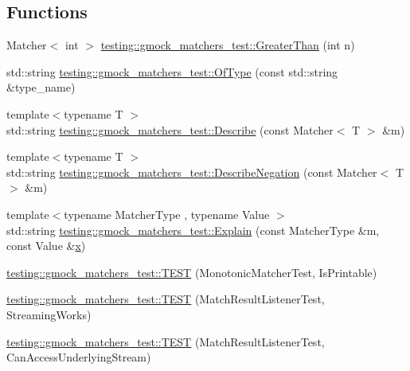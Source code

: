 \subsection*{Functions}
\begin{DoxyCompactItemize}
\item 
Matcher$<$ int $>$ \mbox{\hyperlink{namespacetesting_1_1gmock__matchers__test_a8cf8614a7c9adc8fb00e8af04895f97c}{testing\+::gmock\+\_\+matchers\+\_\+test\+::\+Greater\+Than}} (int n)
\item 
std\+::string \mbox{\hyperlink{namespacetesting_1_1gmock__matchers__test_aea4c2446402f87073f8fec944fc1113c}{testing\+::gmock\+\_\+matchers\+\_\+test\+::\+Of\+Type}} (const std\+::string \&type\+\_\+name)
\item 
{\footnotesize template$<$typename T $>$ }\\std\+::string \mbox{\hyperlink{namespacetesting_1_1gmock__matchers__test_a738a538e1705ea49670aeb3ed25108e6}{testing\+::gmock\+\_\+matchers\+\_\+test\+::\+Describe}} (const Matcher$<$ T $>$ \&m)
\item 
{\footnotesize template$<$typename T $>$ }\\std\+::string \mbox{\hyperlink{namespacetesting_1_1gmock__matchers__test_a96c18b92dede79060a7303fe5d178faf}{testing\+::gmock\+\_\+matchers\+\_\+test\+::\+Describe\+Negation}} (const Matcher$<$ T $>$ \&m)
\item 
{\footnotesize template$<$typename Matcher\+Type , typename Value $>$ }\\std\+::string \mbox{\hyperlink{namespacetesting_1_1gmock__matchers__test_a54e38d7df891801181af4c2acc38c3d5}{testing\+::gmock\+\_\+matchers\+\_\+test\+::\+Explain}} (const Matcher\+Type \&m, const Value \&\mbox{\hyperlink{_obj__test_2lib_2googletest-master_2googlemock_2test_2gmock-matchers__test_8cc_a6150e0515f7202e2fb518f7206ed97dc}{x}})
\item 
\mbox{\hyperlink{namespacetesting_1_1gmock__matchers__test_a4bfc098c6e9ca2766a3dc8f149f62492}{testing\+::gmock\+\_\+matchers\+\_\+test\+::\+T\+E\+ST}} (Monotonic\+Matcher\+Test, Is\+Printable)
\item 
\mbox{\hyperlink{namespacetesting_1_1gmock__matchers__test_a7bc21ec910c3861034d1336fecfcc260}{testing\+::gmock\+\_\+matchers\+\_\+test\+::\+T\+E\+ST}} (Match\+Result\+Listener\+Test, Streaming\+Works)
\item 
\mbox{\hyperlink{namespacetesting_1_1gmock__matchers__test_abc02b215e80c57464c83abdf297b9db7}{testing\+::gmock\+\_\+matchers\+\_\+test\+::\+T\+E\+ST}} (Match\+Result\+Listener\+Test, Can\+Access\+Underlying\+Stream)

\end{DoxyCompactItemize}
